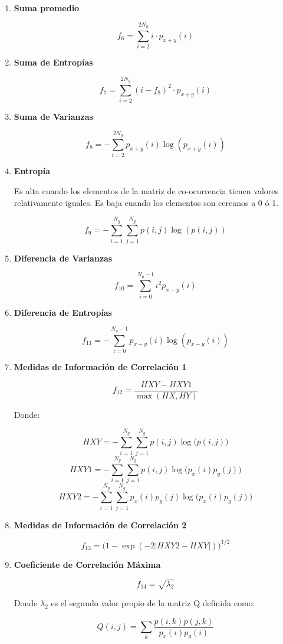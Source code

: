 \begin{enumerate}
\item \textbf{Suma promedio}

\[f_6 = \sum_{i=2}^{2N_g}i \cdot p_{x+y}(i)\]

\item \textbf{Suma de Entropías}

\[f_7 = \sum_{i=2}^{2N_g}(i-f_8)^2 \cdot p_{x+y}(i)\]

\item \textbf{Suma de Varianzas}

\[f_8 = -\sum_{i=2}^{2N_g}p_{x+y}(i)\log(p_{x+y}(i))\]

\item \textbf{Entropía}

Es alta cuando los elementos de la matriz de co-ocurrencia tienen valores relativamente iguales. Es baja cuando los elementos son cercanos a 0 ó 1.

\[f_9 = -\sum_{i=1}^{N_g}\sum_{j=1}^{N_g}p(i,j)\log(p(i,j))\]

\item \textbf{Diferencia de Varianzas}

\[f_{10} = \sum_{i=0}^{N_g-1} i^2 p_{x-y}(i)\]

\item \textbf{Diferencia de Entropías}

\[f_{11} = -\sum_{i=0}^{N_g-1}p_{x-y}(i)\log(p_{x-y}(i))\]

\item \textbf{Medidas de Información de Correlación 1}

\[f_{12} = \frac{HXY-HXY1}{\max(HX,HY)}\]

Donde:

\[HXY = -\sum_{i=1}^{N_g}\sum_{j=1}^{N_g}p(i,j)\log \big(p(i,j)\big)\]
\[HXY1 = -\sum_{i=1}^{N_g}\sum_{j=1}^{N_g}p(i,j)\log \big(p_x(i) p_y(j)\big)\]
\[HXY2 = -\sum_{i=1}^{N_g}\sum_{j=1}^{N_g}p_x(i) p_y(j)\log \big(p_x(i) p_y(j)\big)\]

\item \textbf{Medidas de Información de Correlación 2}

\[f_{13} = \big(1- \exp(-2 |HXY2 - HXY|)\big)^{1/2}\]

\item \textbf{Coeficiente de Correlación Máxima}

\[f_{14} = \sqrt{\lambda_2 }\]

Donde $\lambda_2$ es el segundo valor propio de la matriz Q definida como:

\[Q(i,j) = \sum_k\frac{p(i,k)p(j,k)}{p_x(i)p_y(i)}\]
\end{enumerate}


